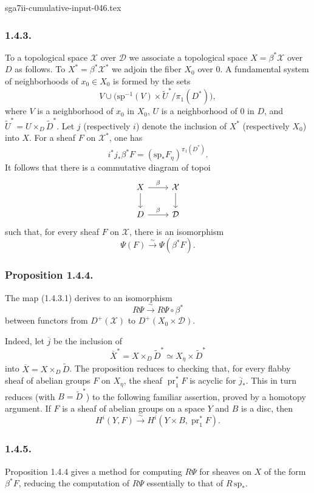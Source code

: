 \begin{filecontents*}{sga7ii-cumulative-input-046.tex}
\subsubsection*{1.4.3.}
To a topological space $\mathcal X$ over $\mathcal D$ we associate a
topological space $X=\beta^*\mathcal X$ over $D$ as follows.  To
$X^*=\beta^*\mathcal X^*$ we adjoin the fiber $X_0$ over $0$.  A
fundamental system of neighborhoods of $x_0\in X_0$ is formed by the
sets
\[
V\cup
\bigl(\mathrm{sp}^{-1}(V)\times\widetilde U^*/\pi_1(D^*)\bigr),
\]
where $V$ is a neighborhood of $x_0$ in $X_0$, $U$ is a neighborhood
of $0$ in $D$, and
$\widetilde U^*=U\times_D\widetilde D^*$.  Let $j$ (respectively $i$)
denote the inclusion of $X^*$ (respectively $X_0$) into $X$.  For a
sheaf $F$ on $\mathcal X^*$, one has
\[
i^*j_*\beta^*F
=(\mathrm{sp}_*F_\eta)^{\pi_1(D^*)}.
\]
It follows that there is a commutative diagram of topoi
\[
\begin{tikzcd}
X \arrow[r, "\beta"] \arrow[d]
  & \mathcal X \arrow[d] \\
D \arrow[r, "\beta"]
  & \mathcal D
\end{tikzcd}
\]
such that, for every sheaf $F$ on $\mathcal X$, there is an
isomorphism
\begin{equation}\tag{1.4.3.1}
\Psi(F)\xrightarrow{\ \sim\ }\Psi(\beta^*F).
\end{equation}

\subsubsection*{Proposition 1.4.4.}
The map (1.4.3.1) derives to an isomorphism
\[
R\Psi\xrightarrow{\ \sim\ }R\Psi\circ\beta^*
\]
between functors from $D^+(\mathcal X)$ to
$D^+(X_0\times\mathcal D)$.

Indeed, let $\overline j$ be the inclusion of
\[
\overline X^*=X\times_D\widetilde D^*
\simeq X_\eta\times\widetilde D^*
\]
into $\overline X=X\times_D\widetilde D$.  The proposition reduces to
checking that, for every flabby sheaf of abelian groups $F$ on
$X_\eta$, the sheaf $\operatorname{pr}_1^*F$ is acyclic for
$\overline j_*$.  This in turn reduces (with $B=\widetilde D^*$) to
the following familiar assertion, proved by a homotopy argument.  If
$F$ is a sheaf of abelian groups on a space $Y$ and $B$ is a disc,
then
\[
H^i(Y,F)\xrightarrow{\ \sim\ }
H^i(Y\times B,\operatorname{pr}_1^*F).
\]

\subsubsection*{1.4.5.}
Proposition 1.4.4 gives a method for computing $R\Psi$ for sheaves on
$X$ of the form $\beta^*F$, reducing the computation of $R\Psi$
essentially to that of $R\,\mathrm{sp}_*$.

\end{filecontents*}
